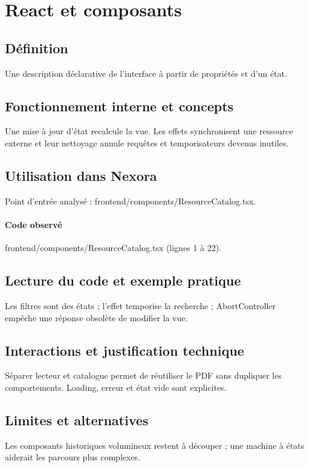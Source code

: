 \section{React et composants}
\subsection*{Définition}
Une description déclarative de l’interface à partir de propriétés et d’un état.

\subsection*{Fonctionnement interne et concepts}
Une mise à jour d’état recalcule la vue. Les effets synchronisent une ressource externe et leur nettoyage annule requêtes et temporisateurs devenus inutiles.

\subsection*{Utilisation dans Nexora}
Point d’entrée analysé : frontend/components/ResourceCatalog.tsx.

\paragraph{Code observé} frontend/components/ResourceCatalog.tsx (lignes 1 à 22).

\subsection*{Lecture du code et exemple pratique}
Les filtres sont des états ; l’effet temporise la recherche ; AbortController empêche une réponse obsolète de modifier la vue.

\subsection*{Interactions et justification technique}
Séparer lecteur et catalogue permet de réutiliser le PDF sans dupliquer les comportements. Loading, erreur et état vide sont explicites.

\subsection*{Limites et alternatives}
Les composants historiques volumineux restent à découper ; une machine à états aiderait les parcours plus complexes.

